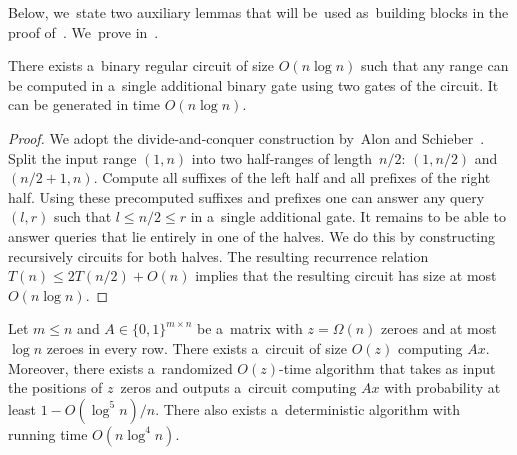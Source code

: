 \documentclass{toc}
\begin{document}
Below, we~state two auxiliary lemmas that will
be~used as~building blocks in the proof
of~.
We~prove 
in~.

\begin{lemma}\label{lemma:decompose}
There exists a~binary regular circuit of size $O(n\log n)$ such that
any range can be computed in a~single additional binary gate
using two gates of the circuit. It can be generated in time
$O(n\log n)$.
\end{lemma}

\begin{proof}%
	We adopt the divide-and-conquer construction by~Alon and
	Schieber~\cite{Alon87optimalpreprocessing}. Split the input range $(1,n)$ into
	two half-ranges of length~$n/2$:
	$(1,n/2)$ and $(n/2+1,n)$.
	Compute all suffixes of the left half and all prefixes of
	the right half.
	Using these precomputed suffixes and
	prefixes one can answer any query $(l,r)$ such that $l \le n/2
	\le r$ in a~single additional gate. It remains to be able to answer
	queries that lie entirely in one of the halves. We do this by
	constructing recursively circuits for both halves. The resulting
	recurrence relation $T(n) \le 2T(n/2)+O(n)$ implies that the
	resulting circuit has size at most $O(n\log n)$.
\end{proof}



\begin{lemma}\label{lemma:permute}
Let $m \le n$ and $A \in \{0,1\}^{m \times n}$
be a~matrix with $z=\Omega(n)$ zeroes and at most $\log n$ zeroes in every row.
There exists a~circuit of size $O(z)$ computing $Ax$. Moreover, there exists
a~randomized $O(z)$-time %
algorithm that takes as input the positions of
$z$~zeros and outputs a~circuit computing $Ax$ with probability at least
$1-O(\log^5n)/n$. There also exists a~deterministic algorithm with
running time $O(n\log^4n)$.
\end{lemma}
\end{document}
